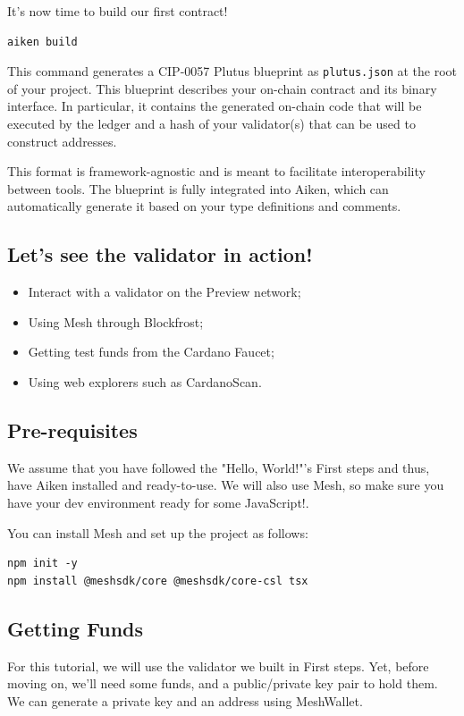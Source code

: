 It's now time to build our first contract!

\begin{verbatim}
aiken build
\end{verbatim}

This command generates a CIP-0057 Plutus blueprint as \texttt{plutus.json} at the root of your project. This blueprint describes your on-chain contract and its binary interface. In particular, it contains the generated on-chain code that will be executed by the ledger and a hash of your validator(s) that can be used to construct addresses.

This format is framework-agnostic and is meant to facilitate interoperability between tools. The blueprint is fully integrated into Aiken, which can automatically generate it based on your type definitions and comments.

\subsection{Let's see the validator in action!}

\begin{itemize}
  \item Interact with a validator on the Preview network;
  \item Using Mesh through Blockfrost;
  \item Getting test funds from the Cardano Faucet;
  \item Using web explorers such as CardanoScan.
\end{itemize}

\subsection{Pre-requisites}
We assume that you have followed the "Hello, World!"'s First steps and thus, have Aiken installed and ready-to-use. We will also use Mesh, so make sure you have your dev environment ready for some JavaScript!.

You can install Mesh and set up the project as follows:

\begin{verbatim}
npm init -y
npm install @meshsdk/core @meshsdk/core-csl tsx
\end{verbatim}

\subsection{Getting Funds}
For this tutorial, we will use the validator we built in First steps. Yet, before moving on, we'll need some funds, and a public/private key pair to hold them. We can generate a private key and an address using MeshWallet.

